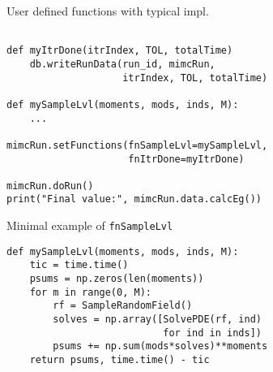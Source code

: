 \begin{frame}[fragile]{User defined functions with typical impl.}
\begin{verbatim}

def myItrDone(itrIndex, TOL, totalTime)
    db.writeRunData(run_id, mimcRun,
                    itrIndex, TOL, totalTime)

def mySampleLvl(moments, mods, inds, M):
    ...

mimcRun.setFunctions(fnSampleLvl=mySampleLvl,
                     fnItrDone=myItrDone)

mimcRun.doRun()
print("Final value:", mimcRun.data.calcEg())
\end{verbatim}
\end{frame}

\begin{frame}[fragile]{Minimal example of \texttt{fnSampleLvl}}
\begin{verbatim}
def mySampleLvl(moments, mods, inds, M):
    tic = time.time()
    psums = np.zeros(len(moments))
    for m in range(0, M):
        rf = SampleRandomField()
        solves = np.array([SolvePDE(rf, ind)
                           for ind in inds])
        psums += np.sum(mods*solves)**moments
    return psums, time.time() - tic
\end{verbatim}
\end{frame}



